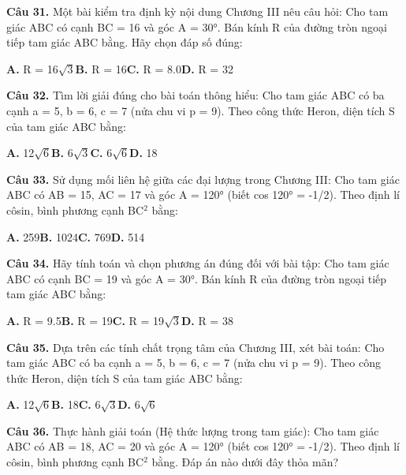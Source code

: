 \documentclass[11pt,a4paper]{article}
\begin{document}
\textbf{\color{primary} Câu 31.} Một bài kiểm tra định kỳ nội dung Chương III nêu câu hỏi: Cho tam giác ABC có cạnh BC = 16 và góc A = 30°. Bán kính R của đường tròn ngoại tiếp tam giác ABC bằng. Hãy chọn đáp số đúng:\par
\hspace*{1.5em}\textbf{A.} R = 16$\sqrt{3}$\quad\quad \textbf{B.} R = 16\quad\quad \textbf{C.} R = 8.0\quad\quad \textbf{D.} R = 32\par\vspace{2pt}
\textbf{\color{primary} Câu 32.} Tìm lời giải đúng cho bài toán thông hiểu: Cho tam giác ABC có ba cạnh a = 5, b = 6, c = 7 (nửa chu vi p = 9). Theo công thức Heron, diện tích S của tam giác ABC bằng:\par
\hspace*{1.5em}\textbf{A.} 12$\sqrt{6}$\quad\quad \textbf{B.} 6$\sqrt{3}$\quad\quad \textbf{C.} 6$\sqrt{6}$\quad\quad \textbf{D.} 18\par\vspace{2pt}
\textbf{\color{primary} Câu 33.} Sử dụng mối liên hệ giữa các đại lượng trong Chương III: Cho tam giác ABC có AB = 15, AC = 17 và góc A = 120° (biết cos 120° = -1/2). Theo định lí côsin, bình phương cạnh BC$^2$ bằng:\par
\hspace*{1.5em}\textbf{A.} 259\quad\quad \textbf{B.} 1024\quad\quad \textbf{C.} 769\quad\quad \textbf{D.} 514\par\vspace{2pt}
\textbf{\color{primary} Câu 34.} Hãy tính toán và chọn phương án đúng đối với bài tập: Cho tam giác ABC có cạnh BC = 19 và góc A = 30°. Bán kính R của đường tròn ngoại tiếp tam giác ABC bằng:\par
\hspace*{1.5em}\textbf{A.} R = 9.5\quad\quad \textbf{B.} R = 19\quad\quad \textbf{C.} R = 19$\sqrt{3}$\quad\quad \textbf{D.} R = 38\par\vspace{2pt}
\textbf{\color{primary} Câu 35.} Dựa trên các tính chất trọng tâm của Chương III, xét bài toán: Cho tam giác ABC có ba cạnh a = 5, b = 6, c = 7 (nửa chu vi p = 9). Theo công thức Heron, diện tích S của tam giác ABC bằng:\par
\hspace*{1.5em}\textbf{A.} 12$\sqrt{6}$\quad\quad \textbf{B.} 18\quad\quad \textbf{C.} 6$\sqrt{3}$\quad\quad \textbf{D.} 6$\sqrt{6}$\par\vspace{2pt}
\textbf{\color{primary} Câu 36.} Thực hành giải toán (Hệ thức lượng trong tam giác): Cho tam giác ABC có AB = 18, AC = 20 và góc A = 120° (biết cos 120° = -1/2). Theo định lí côsin, bình phương cạnh BC$^2$ bằng. Đáp án nào dưới đây thỏa mãn?\par
\end{document}
